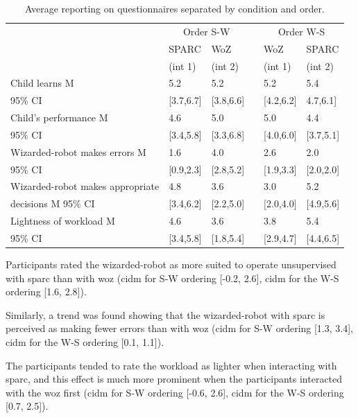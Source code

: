 \begin{table}[t]
	\caption{Average reporting on questionnaires separated by condition and order.}
	\centering
\begin{tabular}{@{}lllcll@{}}\toprule
	& \multicolumn{2}{c}{Order S-W} & \phantom{abc} & \multicolumn{2}{c}{Order W-S} \\
	\cmidrule{2-3} \cmidrule{5-6}
	& SPARC & WoZ && WoZ & SPARC \\
	& (int 1) & (int 2) && (int 1) & (int 2) \\
	\midrule					
		Child learns M & 5.2 & 5.2 && 5.2 & 5.4 \\
		95\% CI & [3.7,6.7] & [3.8,6.6] &&  [4.2,6.2] & 4.7,6.1]\\[.2cm]
		Child's performance M & 4.6 & 5.0 && 5.0 & 4.4 \\
		95\% CI & [3.4,5.8] & [3.3,6.8] && [4.0,6.0] & [3.7,5.1]\\[.2cm]
		Wizarded-robot makes errors M & 1.6 & 4.0 && 2.6 & 2.0 \\
		95\% CI & [0.9,2.3] & [2.8,5.2] && [1.9,3.3] & [2.0,2.0] \\[.2cm]
		Wizarded-robot makes appropriate & 4.8 & 3.6 && 3.0  & 5.2 \\
		decisions M 95\% CI & [3.4,6.2] & [2.2,5.0] && [2.0,4.0] & [4.9,5.6] \\ [.2cm]
		Lightness of workload M & 4.6  & 3.6 && 3.8  & 5.4 \\
		95\% CI & [3.4,5.8] & [1.8,5.4] && [2.9,4.7] & [4.4,6.5] \\
		\bottomrule
	\end{tabular}
	\label{tab:woz_quest_means}
\end{table}


Participants rated the wizarded-robot as more suited to operate unsupervised with \gls{sparc} than with \gls{woz}  (\gls{cidm} for S-W ordering [-0.2, 2.6], \gls{cidm} for the W-S ordering [1.6, 2.8]).

Similarly, a trend was found showing that the wizarded-robot with \gls{sparc} is perceived as making fewer errors than with \gls{woz} (\gls{cidm} for S-W ordering [1.3, 3.4], \gls{cidm} for the W-S ordering [0.1, 1.1]). 

The participants tended to rate the workload as lighter when interacting with \gls{sparc}, and this effect is much more prominent when the participants interacted with the \gls{woz} first (\gls{cidm} for S-W ordering [-0.6, 2.6], \gls{cidm} for the W-S ordering [0.7, 2.5]).

